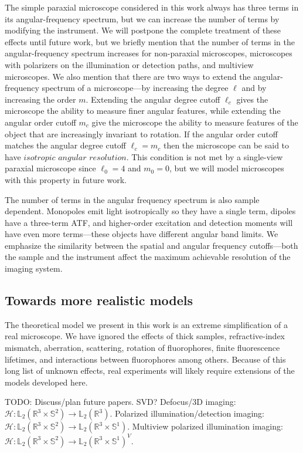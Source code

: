 \documentclass[]{osa-article}
\providecommand{\mc}[1]{\mathcal{#1}}
\providecommand{\mbb}[1]{\mathbb{#1}}
\begin{document}
The simple paraxial microscope considered in this work always has three terms in
its angular-frequency spectrum, but we can increase the number of terms by
modifying the instrument. We will postpone the complete treatment of these
effects until future work, but we briefly mention that the number of terms in
the angular-frequency spectrum increases for non-paraxial microscopes,
microscopes with polarizers on the illumination or detection paths, and
multiview microscopes. We also mention that there are two ways to extend the
angular-frequency spectrum of a microscope---by increasing the degree $\ell$ and
by increasing the order $m$. Extending the angular degree cutoff $\ell_c$ gives
the microscope the ability to measure finer angular features, while extending
the angular order cutoff $m_c$ give the microscope the ability to measure
features of the object that are increasingly invariant to rotation. If the
angular order cutoff matches the angular degree cutoff $\ell_c = m_c$ then the
microscope can be said to have $\textit{isotropic angular resolution}$. This
condition is not met by a single-view paraxial microscope since $\ell_0 = 4$ and
$m_0 = 0$, but we will model microscopes with this property in future work.

The number of terms in the angular frequency spectrum is also sample dependent.
Monopoles emit light isotropically so they have a single term, dipoles have a
three-term ATF, and higher-order excitation and detection moments will have even
more terms---these objects have different angular band limits. We emphasize the
similarity between the spatial and angular frequency cutoffs---both the sample
and the instrument affect the maximum achievable resolution of the imaging
system.

\subsection{Towards more realistic models}
The theoretical model we present in this work is an extreme simplification of a
real microscope. We have ignored the effects of thick samples, refractive-index
mismatch, aberration, scattering, rotation of fluorophores, finite fluorescence
lifetimes, and interactions between fluorophores among others. Because of this
long list of unknown effects, real experiments will likely require extensions of
the models developed here.

TODO: Discuss/plan future papers. SVD?
Defocus/3D imaging:
$\mc{H}: \mbb{L}_2(\mbb{R}^3\times\mbb{S}^2) \rightarrow \mbb{L}_2(\mbb{R}^3)$.
Polarized illumination/detection imaging:
$\mc{H}: \mbb{L}_2(\mbb{R}^3\times\mbb{S}^2) \rightarrow \mbb{L}_2(\mbb{R}^3\times\mbb{S}^1)$.
Multiview polarized illumination imaging:
$\mc{H}: \mbb{L}_2(\mbb{R}^3\times\mbb{S}^2) \rightarrow \mbb{L}_2(\mbb{R}^3\times\mbb{S}^1)^V$.
\end{document}
